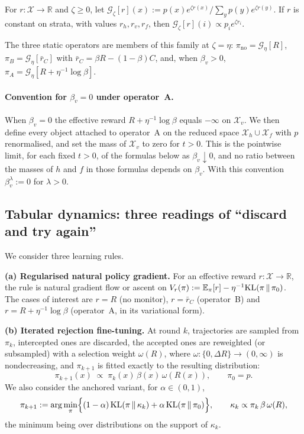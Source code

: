 \begin{definition}\label{def:gibbs-family}
For $r:\mathcal X\to\mathbb R$ and $\zeta\ge 0$, let
$\mathcal G_\zeta[r](x):=p(x)e^{\zeta r(x)}/\sum_y p(y)e^{\zeta r(y)}$.
If $r$ is constant on strata, with values $r_h,r_v,r_f$, then
$\mathcal G_\zeta[r](i)\propto p_i e^{\zeta r_i}$.
\end{definition}

The three static operators are members of this family at $\zeta=\eta$:
$\pi_{\mathrm{no}}=\mathcal G_\eta[R]$,
$\pi_B=\mathcal G_\eta[\bar r_C]$ with
$\bar r_C=\beta R-(1-\beta)C$, and, when $\beta_v>0$,
$\pi_A=\mathcal G_\eta[R+\eta^{-1}\log\beta]$.

\paragraph{Convention for $\beta_v=0$ under operator~A.}
When $\beta_v=0$ the effective reward $R+\eta^{-1}\log\beta$ equals
$-\infty$ on $\mathcal X_v$. We then define every object attached to
operator~A on the reduced space $\mathcal X_h\cup\mathcal X_f$ with $p$
renormalised, and set the mass of $\mathcal X_v$ to zero for $t>0$. This is
the pointwise limit, for each fixed $t>0$, of the formulas below as
$\beta_v\downarrow 0$, and no ratio between the masses of $h$ and $f$ in
those formulas depends on $\beta_v$. With this convention $\beta_v^{\lambda}:=0$
for $\lambda>0$.

\subsection{Tabular dynamics: three readings of ``discard and try again''}

We consider three learning rules.

\smallskip\noindent\textbf{(a) Regularised natural policy gradient.}
For an effective reward $r:\mathcal X\to\mathbb R$, the rule is natural
gradient flow or ascent on
$V_r(\pi):=\mathbb{E}_\pi[r]-\eta^{-1}\mathrm{KL}(\pi\,\|\,\pi_0)$. The cases of
interest are $r=R$ (no monitor), $r=\bar r_C$ (operator~B) and
$r=R+\eta^{-1}\log\beta$ (operator~A, in its variational form).

\smallskip\noindent\textbf{(b) Iterated rejection fine-tuning.}
At round $k$, trajectories are sampled from $\pi_k$, intercepted ones are
discarded, the accepted ones are reweighted (or subsampled) with a
selection weight $\omega(R)$, where $\omega:\{0,\Delta R\}\to(0,\infty)$ is
nondecreasing, and $\pi_{k+1}$ is fitted exactly to the resulting
distribution:
\begin{equation}\label{eq:rejection-ft}
\pi_{k+1}(x)\;\propto\;\pi_k(x)\,\beta(x)\,\omega(R(x)),\qquad \pi_0=p .
\end{equation}
We also consider the anchored variant, for $\alpha\in(0,1)$,
\begin{equation}\label{eq:rejection-ft-anchored}
\pi_{k+1}:=\arg\min_{\pi}\Bigl\{(1-\alpha)\,\mathrm{KL}(\pi\,\|\,\kappa_k)
+\alpha\,\mathrm{KL}(\pi\,\|\,\pi_0)\Bigr\},
\qquad \kappa_k\propto\pi_k\,\beta\,\omega(R),
\end{equation}
the minimum being over distributions on the support of $\kappa_k$.

